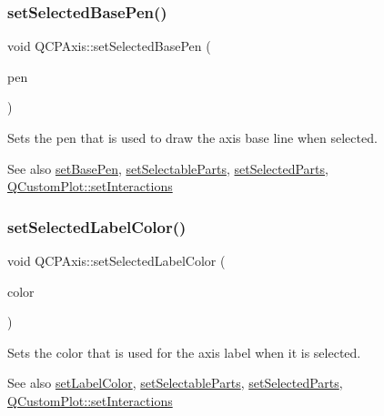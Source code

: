 \subsubsection{\texorpdfstring{set\+Selected\+Base\+Pen()}{setSelectedBasePen()}}
{\footnotesize\ttfamily void Q\+C\+P\+Axis\+::set\+Selected\+Base\+Pen (\begin{DoxyParamCaption}\item[{const Q\+Pen \&}]{pen }\end{DoxyParamCaption})}

Sets the pen that is used to draw the axis base line when selected.

\begin{DoxySeeAlso}{See also}
\mbox{\hyperlink{class_q_c_p_axis_a778d45fb71b3c7ab3bb7079e18b058e4}{set\+Base\+Pen}}, \mbox{\hyperlink{class_q_c_p_axis_a513f9b9e326c505d9bec54880031b085}{set\+Selectable\+Parts}}, \mbox{\hyperlink{class_q_c_p_axis_ab9d7a69277dcbed9119b3c1f25ca19c3}{set\+Selected\+Parts}}, \mbox{\hyperlink{class_q_custom_plot_a5ee1e2f6ae27419deca53e75907c27e5}{Q\+Custom\+Plot\+::set\+Interactions}} 
\end{DoxySeeAlso}
\mbox{\label{class_q_c_p_axis_a5d502dec597c634f491fdd73d151c72d}} 
\subsubsection{\texorpdfstring{set\+Selected\+Label\+Color()}{setSelectedLabelColor()}}
{\footnotesize\ttfamily void Q\+C\+P\+Axis\+::set\+Selected\+Label\+Color (\begin{DoxyParamCaption}\item[{const Q\+Color \&}]{color }\end{DoxyParamCaption})}

Sets the color that is used for the axis label when it is selected.

\begin{DoxySeeAlso}{See also}
\mbox{\hyperlink{class_q_c_p_axis_a6c906fe56d75f0122335b9f79b999608}{set\+Label\+Color}}, \mbox{\hyperlink{class_q_c_p_axis_a513f9b9e326c505d9bec54880031b085}{set\+Selectable\+Parts}}, \mbox{\hyperlink{class_q_c_p_axis_ab9d7a69277dcbed9119b3c1f25ca19c3}{set\+Selected\+Parts}}, \mbox{\hyperlink{class_q_custom_plot_a5ee1e2f6ae27419deca53e75907c27e5}{Q\+Custom\+Plot\+::set\+Interactions}} 
\end{DoxySeeAlso}
\mbox{\label{class_q_c_p_axis_a02ec2a75d4d8401eaab834fbc6803d30}} 
